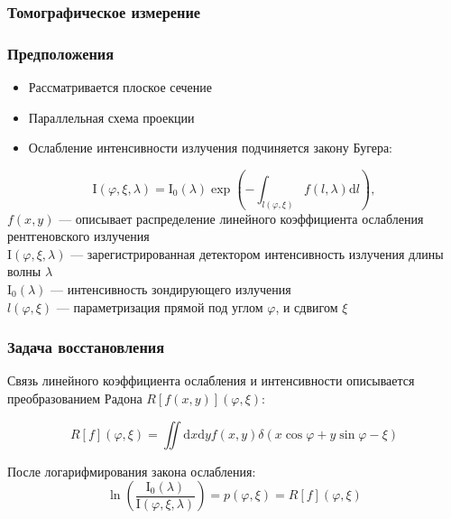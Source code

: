 \begin{frame}
\frametitle{Томографическое измерение}
\end{frame}

\begingroup

\begin{frame}
\frametitle{Предположения}
\begin{itemize}
  \item Рассматривается плоское сечение
  \item Параллельная схема проекции
  \item Ослабление интенсивности излучения подчиняется закону Бугера:
\end{itemize}
  $$
  \mathrm I \left( \varphi, \xi , \lambda \right) = \mathrm I_0(\lambda) \exp\left( {-\int_{l(\varphi, \xi)} \! f(l, \lambda) \mathrm d l }\right),
  $$
  \small
  $f(x, y)$ ---  описывает распределение линейного коэффициента ослабления рентгеновского излучения \\
  $\mathrm I(\varphi, \xi, \lambda)$ --- зарегистрированная детектором интенсивность излучения длины волны $\lambda$ \\
  $\mathrm I_0(\lambda)$ --- интенсивность зондирующего излучения \\
  $l(\varphi, \xi)$ --- параметризация прямой под углом $\varphi$, и сдвигом $\xi$ \\
\end{frame}

\begin{frame}
\frametitle{Задача восстановления}
  Связь линейного коэффициента ослабления и интенсивности описывается преобразованием Радона $R[f(x,y)](\varphi, \xi)$:

  $$
  R[f](\varphi, \xi) = 
 \iint \! \mathrm d x \mathrm d y f(x,y)\delta(x\cos\varphi + y\sin\varphi - \xi)
  $$


  После логарифмирования закона ослабления:
  $$
  \ln \left (\frac{\mathrm I_0(\lambda)}{\mathrm I(\varphi, \xi, \lambda)} \right) = p(\varphi, \xi) = R[f](\varphi, \xi)
  $$

\end{frame}

